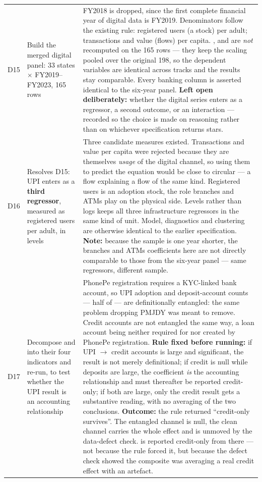 {\begin{longtable}{@{}p{0.7cm}p{3.1cm}p{10.5cm}@{}}
D15 & Build the merged digital panel: 33 states $\times$ FY2019--FY2023, 165 rows &
FY2018 is dropped, since the first complete financial year of digital
data is FY2019. Denominators follow the existing rule: registered users (a stock) per adult;
transactions and value (flows) per capita. \Access{}, \Usage{} and \AUG{} are \emph{not} recomputed
on the 165 rows --- they keep the scaling pooled over the original 198, so the dependent variables
are identical across tracks and the results stay comparable. Every banking column is asserted
identical to the six-year panel. \textbf{Left open deliberately:} whether the digital series enters
as a regressor, a second outcome, or an interaction --- recorded so the choice is made on reasoning
rather than on whichever specification returns stars. \\
\addlinespace

D16 & Resolves D15: UPI enters as a \textbf{third regressor}, measured as registered users per
adult, in levels &
Three candidate measures existed. Transactions and value per capita were rejected because they are
themselves \emph{usage} of the digital channel, so using them to predict the \Usage{} equation
would be close to circular --- a flow explaining a flow of the same kind. Registered users is an
adoption stock, the role branches and ATMs play on the physical side. Levels rather than logs keeps
all three infrastructure regressors in the same kind of unit. Model, diagnostics and clustering are
otherwise identical to the earlier specification. \textbf{Note:} because the sample is one year
shorter, the branches and ATMs coefficients here are not directly comparable to those from the
six-year panel --- same regressors, different sample. \\
\addlinespace

D17 & Decompose \Access{} and \Usage{} into their four indicators and re-run, to test whether the
UPI result is an accounting relationship &
PhonePe registration requires a KYC-linked bank account, so UPI adoption and deposit-account counts
--- half of \Access{} --- are definitionally entangled: the same problem dropping PMJDY was meant
to remove. Credit accounts are not entangled the same way, a loan account being neither required
for nor created by PhonePe registration. \textbf{Rule fixed before running:} if UPI $\to$ credit
accounts is large and significant, the \Access{} result is not merely definitional; if credit is
null while deposits are large, the \Access{} coefficient \emph{is} the accounting relationship and
\Access{} must thereafter be reported credit-only; if both are large, only the credit result gets a
substantive reading, with no averaging of the two conclusions.
\textbf{Outcome:} the rule returned ``credit-only survives''. The entangled channel is null, the
clean channel carries the whole effect and is unmoved by the data-defect check. \Access{} is
reported credit-only from there --- not because the rule forced it, but because the defect check
showed the composite was averaging a real credit effect with an artefact. \\

\end{longtable}
}

